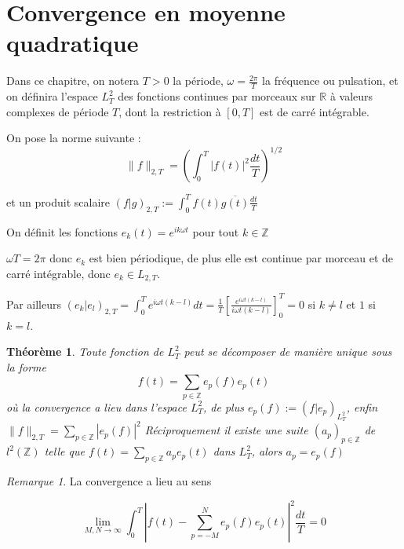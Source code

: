 \documentclass[]{article}
\newtheorem{mythm}{Théorème}
\theoremstyle{remark}
\newtheorem{myrem}{Remarque}
\theoremstyle{definition}
\begin{document}
\section{Convergence en moyenne quadratique}

Dans ce chapitre, on notera $T > 0$ la période, $\omega = \frac{2 \pi}{T}$ la fréquence ou pulsation, et on définira l'espace $L_T^2$ des fonctions continues par morceaux sur $\mathbb{R}$ à valeurs complexes de période $T$, dont la restriction à $[0, T]$ est de carré intégrable.

On pose la norme suivante :
$$\|f\|_{2,T} = \left(\int_{0}^{T} |f(t)|^2 \frac{dt}{T}\right)^{1/2}$$

et un produit scalaire $(f|g)_{2, T} := \int_{0}^{T} f(t)\overline{g(t)} \frac{dt}{T}$

On définit les fonctions $e_k(t) = e^{i k \omega t}$ pour tout $k \in \mathbb{Z}$

$\omega T = 2 \pi$ donc $e_k$ est bien périodique, de plus elle est continue par morceau et de carré intégrable, donc $e_k \in L_{2, T}$.

Par ailleurs $(e_k|e_l)_{2, T} = \int_{0}^{T} e^{i \omega t (k-l)}dt = \frac{1}{T} [\frac{e^{i \omega t (k-l)}}{i \omega t (k-l)}]^T_0 = 0$ si $k \neq l$ et $1$ si $k=l$.

\begin{mythm}
	Toute fonction de $L_{T}^2$ peut se décomposer de manière unique sous la forme $$f(t) = \sum_{p \in \mathbb{Z}} e_p(f) e_p(t)$$
	où la convergence a lieu dans l'espace $L^2_T$, de plus $e_p(f):=(f|e_p)_{L^2_T}$, enfin $\|f\|_{2, T} = \sum_{p \in \mathbb{Z}} |e_p(f)|^2$
	Réciproquement il existe une suite $(a_p)_{p \in \mathbb{Z}}$ de $l^2(\mathbb{Z})$ telle que $f(t) = \sum_{p \in \mathbb{Z}} a_p e_p(t)$ dans $L_T^2$, alors $a_p = e_p(f)$
\end{mythm}

\begin{myrem}
	La convergence a lieu au sens
	
	$$\lim\limits_{M, N \to \infty} \int_{0}^{T} |f(t) - \sum_{p=-M}^{N} e_p(f) e_p(t)|^2 \frac{dt}{T} = 0$$
\end{myrem}
\end{document}
